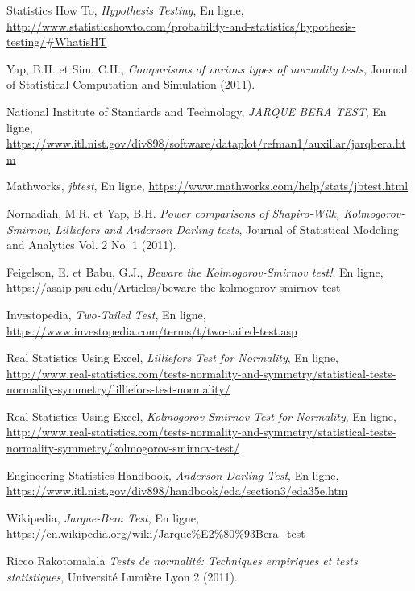 \documentclass{article}       %
\begin{document}
\begin{thebibliography}{99}


 Statistics How To, \emph{Hypothesis Testing}, En ligne, \url{http://www.statisticshowto.com/probability-and-statistics/hypothesis-testing/#WhatisHT}


 Yap, B.H. et Sim, C.H., \emph{Comparisons of various types of normality tests}, Journal of Statistical Computation and Simulation (2011).

 National Institute of Standards and Technology, \emph{JARQUE BERA TEST}, En ligne, \url{https://www.itl.nist.gov/div898/software/dataplot/refman1/auxillar/jarqbera.htm}

 Mathworks, \emph{jbtest}, En ligne, \url{https://www.mathworks.com/help/stats/jbtest.html}

 Nornadiah, M.R. et Yap, B.H. \emph{Power comparisons of Shapiro-Wilk, Kolmogorov-Smirnov,
Lilliefors and Anderson-Darling tests}, Journal of Statistical Modeling and Analytics Vol. 2 No. 1 (2011).


 Feigelson, E. et Babu, G.J., \emph{Beware the Kolmogorov-Smirnov test!}, En ligne, \url{https://asaip.psu.edu/Articles/beware-the-kolmogorov-smirnov-test}

 Investopedia, \emph{Two-Tailed Test}, En ligne, \url{https://www.investopedia.com/terms/t/two-tailed-test.asp}

 Real Statistics Using Excel, \emph{Lilliefors Test for Normality}, En ligne, \url{http://www.real-statistics.com/tests-normality-and-symmetry/statistical-tests-normality-symmetry/lilliefors-test-normality/}

 Real Statistics Using Excel, \emph{Kolmogorov-Smirnov Test for Normality}, En ligne, \url{http://www.real-statistics.com/tests-normality-and-symmetry/statistical-tests-normality-symmetry/kolmogorov-smirnov-test/}

 Engineering Statistics Handbook, \emph{Anderson-Darling Test}, En ligne, \url{https://www.itl.nist.gov/div898/handbook/eda/section3/eda35e.htm}

 Wikipedia, \emph{Jarque-Bera Test}, En ligne, \url{https://en.wikipedia.org/wiki/Jarque\%E2\%80\%93Bera_test}

 Ricco Rakotomalala \emph{Tests de normalité:
Techniques empiriques et tests statistiques}, Université Lumière Lyon 2 (2011).


\end{thebibliography}
\end{document}
